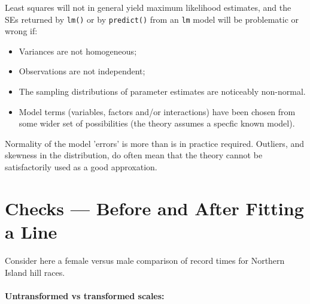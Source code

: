 \documentclass{tufte-book}\usepackage[]{graphicx}\usepackage[]{color}
\begin{document}
Least squares will not in general yield maximum likelihood estimates,
and the SEs returned by \texttt{lm()} or by \texttt{predict()} from
an \texttt{lm} model will be problematic or wrong if:
\begin{itemize}
\item Variances are not homogeneous;
    \item Observations are not independent;
    \item The sampling distributions of parameter estimates are
      noticeably non-normal.
    \item Model terms 
    (variables, factors and/or interactions) have
      been chosen from some wider set of possibilities (the theory
      assumes a specfic known model).
 \end{itemize}

 Normality of the model 'errors' is more than is in practice required.
 Outliers, and skewness in the distribution, do often mean that the
 theory cannot be satisfactorily used as a good approxation.

\section{Checks --- Before and After Fitting a Line}

Consider here a female versus male comparison of record times for
Northern Island hill races.

\paragraph{Untransformed vs transformed scales:}
\end{document}
